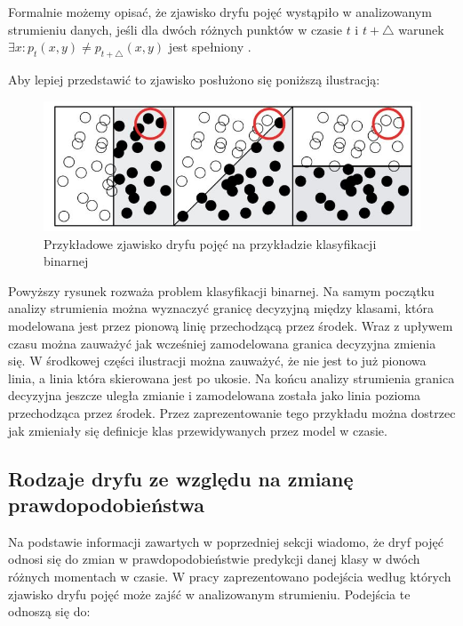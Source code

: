 Formalnie możemy opisać, że zjawisko dryfu pojęć wystąpiło w analizowanym strumieniu danych, jeśli dla dwóch różnych punktów w czasie $t$ i $t + \triangle$ warunek $\exists x : p_t(x, y) \ne p_{t + \triangle}(x, y)$ jest spełniony \cite{Article:DriftGama}\cite{Article:DriftGama2}.

Aby lepiej przedstawić to zjawisko posłużono się poniższą ilustracją:

\begin{figure}[h] 
    \centering\includegraphics[width=14cm]{figures/concept_drift_example.JPG}
    \caption{Przykładowe zjawisko dryfu pojęć na przykładzie klasyfikacji binarnej \cite{DBrzezinski:Prezentacja}}
\end{figure}

\noindent Powyższy rysunek rozważa problem klasyfikacji binarnej. Na samym początku analizy strumienia można wyznaczyć granicę decyzyjną między klasami, która modelowana jest przez pionową linię przechodzącą przez środek. Wraz z upływem czasu można zauważyć jak wcześniej zamodelowana granica decyzyjna zmienia się. W środkowej części ilustracji można zauważyć, że nie jest to już pionowa linia, a linia która skierowana jest po ukosie. Na końcu analizy strumienia granica decyzyjna jeszcze uległa zmianie i zamodelowana została jako linia pozioma przechodząca przez środek. Przez zaprezentowanie tego przykładu można dostrzec jak zmieniały się definicje klas przewidywanych przez model w czasie.

\subsection{Rodzaje dryfu ze względu na zmianę prawdopodobieństwa}

\noindent Na podstawie informacji zawartych w poprzedniej sekcji wiadomo, że dryf pojęć odnosi się do zmian w prawdopodobieństwie predykcji danej klasy w dwóch różnych momentach w czasie. W pracy \cite{Article:Kelly} zaprezentowano podejścia według których zjawisko dryfu pojęć może zajść w analizowanym strumieniu. Podejścia te odnoszą się do:

